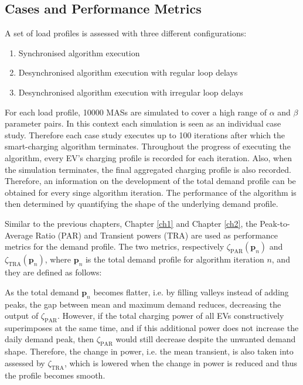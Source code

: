 \subsection{Cases and Performance Metrics}
\label{ch3:subsec:cases-and-metrics}

A set of load profiles is assessed with three different configurations:

\begin{enumerate}
	\item Synchronised algorithm execution
	\item Desynchronised algorithm execution with regular loop delays
	\item Desynchronised algorithm execution with irregular loop delays
\end{enumerate}

For each load profile, 10000 MASs are simulated to cover a high range of $\alpha$ and $\beta$ parameter pairs.
In this context each simulation is seen as an individual case study.
Therefore each case study executes up to 100 iterations after which the smart-charging algorithm terminates.
Throughout the progress of executing the algorithm, every EV's charging profile is recorded for each iteration.
Also, when the simulation terminates, the final aggregated charging profile is also recorded.
Therefore, an information on the development of the total demand profile can be obtained for every singe algorithm iteration.
The performance of the algorithm is then determined by quantifying the shape of the underlying demand profile.

Similar to the previous chapters, Chapter \ref{ch1} and Chapter \ref{ch2}, the Peak-to-Average Ratio (PAR) and Transient powers (TRA) are used as performance metrics for the demand profile.
The two metrics, respectively $\zeta_\text{PAR}(\textbf{p}_n)$ and $\zeta_\text{TRA}(\textbf{p}_n)$, where $\textbf{p}_n$ is the total demand profile for algorithm iteration $n$, and they are defined as follows:



As the total demand $\textbf{p}_n$ becomes flatter, i.e. by filling valleys instead of adding peaks, the gap between mean and maximum demand reduces, decreasing the output of $\zeta_\text{PAR}$.
However, if the total charging power of all EVs constructively superimposes at the same time, and if this additional power does not increase the daily demand peak, then $\zeta_\text{PAR}$ would still decrease despite the unwanted demand shape.
Therefore, the change in power, i.e. the mean transient, is also taken into assessed by $\zeta_\text{TRA}$, which is lowered when the change in power is reduced and thus the profile becomes smooth.

